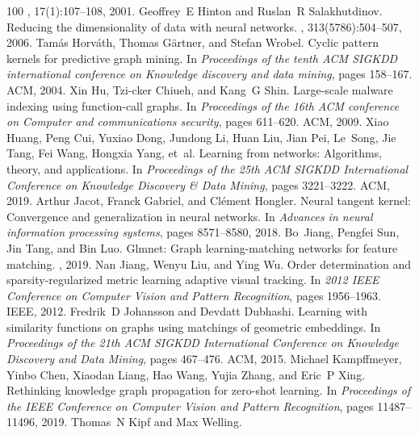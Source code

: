 \begin{thebibliography}{100}
, 17(1):107--108, 2001.
Geoffrey~E Hinton and Ruslan~R Salakhutdinov.
\newblock Reducing the dimensionality of data with neural networks.
, 313(5786):504--507, 2006.
Tam{\'a}s Horv{\'a}th, Thomas G{\"a}rtner, and Stefan Wrobel.
\newblock Cyclic pattern kernels for predictive graph mining.
\newblock In {\em Proceedings of the tenth ACM SIGKDD international conference
  on Knowledge discovery and data mining}, pages 158--167. ACM, 2004.
Xin Hu, Tzi-cker Chiueh, and Kang~G Shin.
\newblock Large-scale malware indexing using function-call graphs.
\newblock In {\em Proceedings of the 16th ACM conference on Computer and
  communications security}, pages 611--620. ACM, 2009.
Xiao Huang, Peng Cui, Yuxiao Dong, Jundong Li, Huan Liu, Jian Pei, Le~Song, Jie
  Tang, Fei Wang, Hongxia Yang, et~al.
\newblock Learning from networks: Algorithms, theory, and applications.
\newblock In {\em Proceedings of the 25th ACM SIGKDD International Conference
  on Knowledge Discovery \& Data Mining}, pages 3221--3222. ACM, 2019.
Arthur Jacot, Franck Gabriel, and Cl{\'e}ment Hongler.
\newblock Neural tangent kernel: Convergence and generalization in neural
  networks.
\newblock In {\em Advances in neural information processing systems}, pages
  8571--8580, 2018.
Bo~Jiang, Pengfei Sun, Jin Tang, and Bin Luo.
\newblock Glmnet: Graph learning-matching networks for feature matching.
, 2019.
Nan Jiang, Wenyu Liu, and Ying Wu.
\newblock Order determination and sparsity-regularized metric learning adaptive
  visual tracking.
\newblock In {\em 2012 IEEE Conference on Computer Vision and Pattern
  Recognition}, pages 1956--1963. IEEE, 2012.
Fredrik~D Johansson and Devdatt Dubhashi.
\newblock Learning with similarity functions on graphs using matchings of
  geometric embeddings.
\newblock In {\em Proceedings of the 21th ACM SIGKDD International Conference
  on Knowledge Discovery and Data Mining}, pages 467--476. ACM, 2015.
Michael Kampffmeyer, Yinbo Chen, Xiaodan Liang, Hao Wang, Yujia Zhang, and
  Eric~P Xing.
\newblock Rethinking knowledge graph propagation for zero-shot learning.
\newblock In {\em Proceedings of the IEEE Conference on Computer Vision and
  Pattern Recognition}, pages 11487--11496, 2019.
Thomas~N Kipf and Max Welling.

\end{thebibliography}

